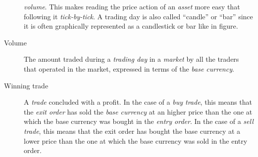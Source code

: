\begin{description}
		\textit{volume}. This makes reading the price action of an
		\textit{asset} more easy that following it \emph{tick-by-tick}.
		A trading day is also called \enquote{candle} or \enquote{bar}
		since it is often graphically represented as a candlestick or
		bar like in figure.
	\item[Volume] The amount traded during a \textit{trading day} in a
		\textit{market} by all the traders that operated in the market,
		expressed in terms of the \textit{base currency}.
	\item[Winning trade] A \textit{trade} concluded with a profit. In the
		case of a \textit{buy trade}, this means that the \textit{exit
		order} has sold the \textit{base currency} at an higher price
		than the one at which the base currency was bought in the
		\textit{entry order}. In the case of a \textit{sell trade}, this
		means that the exit order has bought the base currency at a
		lower price than the one at which the base currency was sold in
		the entry order.
\end{description}
